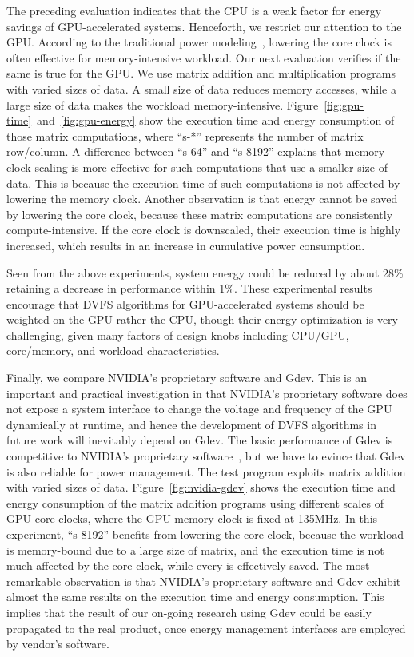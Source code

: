 The preceding evaluation indicates that the CPU is a weak factor for
energy savings of GPU-accelerated systems.
Henceforth, we restrict our attention to the GPU.
According to the traditional power modeling~\cite{Hsu2001}, lowering the
core clock is often effective for memory-intensive workload.
Our next evaluation verifies if the same is true for the GPU.
We use matrix addition and multiplication programs with varied sizes of
data.
A small size of data reduces memory accesses, while a large size of data
makes the workload memory-intensive.
Figure~\ref{fig:gpu-time}~and~\ref{fig:gpu-energy} show the execution
time and energy consumption of those matrix computations, where ``s-*''
represents the number of matrix row/column.
A difference between ``s-64'' and ``s-8192'' explains that memory-clock
scaling is more effective for such computations that use a smaller size
of data.
This is because the execution time of such computations is not
affected by lowering the memory clock.
Another observation is that energy cannot be saved by lowering the core
clock, because these matrix computations are consistently
compute-intensive.
If the core clock is downscaled, their execution time is highly
increased, which results in an increase in cumulative power
consumption.

Seen from the above experiments, system energy could be reduced
by about 28\% retaining a decrease in performance within 1\%.
These experimental results encourage that DVFS algorithms for
GPU-accelerated systems should be weighted on the GPU rather the CPU,
though their energy optimization is very challenging, given many factors
of design knobs including CPU/GPU, core/memory, and workload
characteristics.

Finally, we compare NVIDIA's proprietary software and Gdev.
This is an important and practical investigation in that NVIDIA's
proprietary software does not expose a system interface to change
the voltage and frequency of the GPU dynamically at runtime, and hence
the development of DVFS algorithms in future work will inevitably depend
on Gdev.
The basic performance of Gdev is competitive to NVIDIA's proprietary
software~\cite{Kato2012}, but we have to evince that Gdev is also
reliable for power management.
The test program exploits matrix addition with varied sizes of data.
Figure~\ref{fig:nvidia-gdev} shows the execution time and energy
consumption of the matrix addition programs using different scales of
GPU core clocks, where the GPU memory clock is fixed at 135MHz.
In this experiment, ``s-8192'' benefits from lowering the core clock,
because the workload is memory-bound due to a large size of matrix, and
the execution time is not much affected by the core clock, while every
is effectively saved.
The most remarkable observation is that NVIDIA's proprietary software
and Gdev exhibit almost the same results on the execution time and energy
consumption.
This implies that the result of our on-going research using Gdev could
be easily propagated to the real product, once energy management
interfaces are employed by vendor's software.
